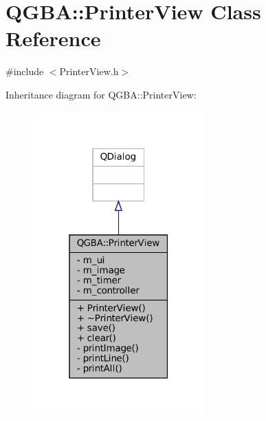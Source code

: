 \hypertarget{class_q_g_b_a_1_1_printer_view}{}\section{Q\+G\+BA\+:\+:Printer\+View Class Reference}
\label{class_q_g_b_a_1_1_printer_view}


{\ttfamily \#include $<$Printer\+View.\+h$>$}



Inheritance diagram for Q\+G\+BA\+:\+:Printer\+View\+:
\nopagebreak
\begin{figure}[H]
\begin{center}
\leavevmode
\includegraphics[width=187pt]{class_q_g_b_a_1_1_printer_view__inherit__graph}
\end{center}
\end{figure}


